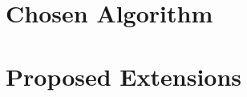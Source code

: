 \documentclass[11pt]{article}
\begin{document}
\maketitle
\section*{Chosen Algorithm}
\section*{Proposed Extensions}
\end{document}
